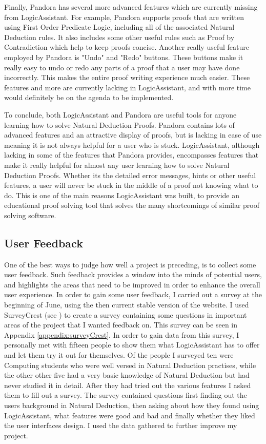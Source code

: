 Finally, Pandora has several more advanced features which are currently missing from LogicAssistant. For example, Pandora supports proofs that are written using First Order Predicate Logic, including all of the associated Natural Deduction rules. It also includes some other useful rules such as Proof by Contradiction which help to keep proofs concise. Another really useful feature employed by Pandora is "Undo" and "Redo" buttons. These buttons make it really easy to undo or redo any parts of a proof that a user may have done incorrectly. This makes the entire proof writing experience much easier. These features and more are currently lacking in LogicAssistant, and with more time would definitely be on the agenda to be implemented.

To conclude, both LogicAssistant and Pandora are useful tools for anyone learning how to solve Natural Deduction Proofs. Pandora contains lots of advanced features and an attractive display of proofs, but is lacking in ease of use meaning it is not always helpful for a user who is stuck. LogicAssistant, although lacking in some of the features that Pandora provides, encompasses features that make it really helpful for almost any user learning how to solve Natural Deduction Proofs. Whether its the detailed error messages, hints or other useful features, a user will never be stuck in the middle of a proof not knowing what to do. This is one of the main reasons LogicAssistant was built, to provide an educational proof solving tool that solves the many shortcomings of similar proof solving software.

\subsection{User Feedback \label{feedback}}

One of the best ways to judge how well a project is preceding, is to collect some user feedback. Such feedback provides a window into the minds of potential users, and highlights the areas that need to be improved in order to enhance the overall user experience. In order to gain some user feedback, I carried out a survey at the beginning of June, using the then current stable version of the website. I used SurveyCrest (see \cite{surveyCrest}) to create a survey containing some questions in important areas of the project that I wanted feedback on. This survey can be seen in Appendix \ref{appendix:surveyCrest}. In order to gain data from this survey, I personally met with fifteen people to show them what LogicAssistant has to offer and let them try it out for themselves. Of the people I surveyed ten were Computing students who were well versed in Natural Deduction practises, while the other other five had a very basic knowledge of Natural Deduction but had never studied it in detail. After they had tried out the various features I asked them to fill out a survey. The survey contained questions first finding out the users background in Natural Deduction, then asking about how they found using LogicAssistant, what features were good and bad and finally whether they liked the user interfaces design. I used the data gathered to further improve my project.

